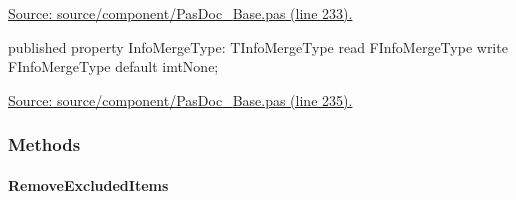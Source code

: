 \documentclass{report}
\newif\ifpdf
\begin{document}
\begin{list}{}
\begin{flushleft}
\ifpdf
\end{flushleft}
\fi


\par  \par
\href{https://github.com/pasdoc/pasdoc/blob/master/source/component/PasDoc_Base.pas#L233}{Source: source/component/PasDoc{\_}Base.pas (line 233).}\label{PasDoc_Base.TPasDoc-InfoMergeType}
\item[\textbf{InfoMergeType}\hfill]
\ifpdf
\begin{flushleft}
\fi
\begin{ttfamily}
published property InfoMergeType: TInfoMergeType
      read FInfoMergeType write FInfoMergeType default imtNone;\end{ttfamily}

\ifpdf
\end{flushleft}
\fi


\par  \par
\href{https://github.com/pasdoc/pasdoc/blob/master/source/component/PasDoc_Base.pas#L235}{Source: source/component/PasDoc{\_}Base.pas (line 235).}\end{list}
\subsubsection*{\large{\textbf{Methods}}\normalsize\hspace{1ex}\hfill}
\paragraph*{RemoveExcludedItems}\hspace*{\fill}
\end{document}
